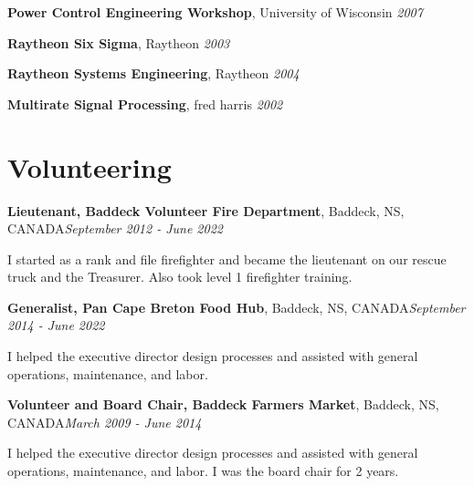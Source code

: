 \documentclass[letter,11pt]{article}
\newenvironment{noindentblock}{%
  \begin{list}{}{%
    \setlength{\leftmargin}{0in} %
    \setlength{\rightmargin}{.25in} %
    \setlength{\topsep}{0pt} %
    \setlength{\parsep}{0pt} %
  }
  \item[]}{\end{list}}
\begin{document}
\noindent
\textbf{Power Control Engineering Workshop}, University of Wisconsin \hfill \textit{2007}

\noindent
\textbf{Raytheon Six Sigma}, Raytheon \hfill \textit{2003}

\noindent
\textbf{Raytheon Systems Engineering}, Raytheon \hfill \textit{2004}

\noindent
\textbf{Multirate Signal Processing}, fred harris \hfill \textit{2002}

\pagebreak
\section*{Volunteering}
\noindent
\textbf{Lieutenant, Baddeck Volunteer Fire Department}, Baddeck, NS, CANADA\hfill \textit{September 2012 - June 2022}
\begin{noindentblock}
  I started as a rank and file firefighter and became the lieutenant on our rescue truck and the Treasurer. Also took level 1 firefighter training.
\end{noindentblock}

\noindent
\textbf{Generalist, Pan Cape Breton Food Hub}, Baddeck, NS, CANADA\hfill \textit{September 2014 - June 2022}
\begin{noindentblock}
  I helped the executive director design processes and assisted with general operations, maintenance, and labor.
\end{noindentblock}

\noindent
\textbf{Volunteer and Board Chair, Baddeck Farmers Market}, Baddeck, NS, CANADA\hfill \textit{March 2009 - June 2014}
\begin{noindentblock}
  I helped the executive director design processes and assisted with general operations, maintenance, and labor. I was the board chair for 2 years.
\end{noindentblock}
\end{document}
